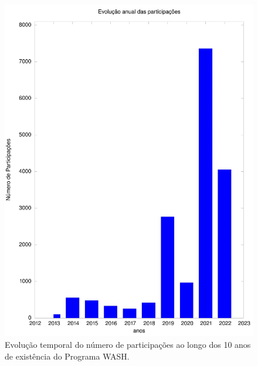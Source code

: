 \documentclass[
12pt,		%
openright,	%
twoside,  %
a4paper,			%
chapter=TITLE,		%
english,			%
french,				%
spanish,			%
brazil				%
]{USPSC-classe/USPSC}
\begin{document}
\captionsetup{format=plain}
\begin{figure}[max size={\textwidth}{\textheight}]

\centering


\begin{minipage}[b]{0.4\linewidth}
        \centering
                \includegraphics[width=1.0\linewidth]{../../imagens/output-participantes.jpeg}
                \caption{Evolu\c{c}\~ao temporal do n\'umero de participa\c{c}\~oes ao longo dos 10 anos de exist\^encia do Programa WASH.}
                \label{19699bcc5ab8317274249d6743d62534dbfb95fa}
\end{minipage}%
\hspace{0.5cm}
\begin{minipage}[b]{0.4\linewidth}
        \centering

\end{minipage}
\end{figure}
\end{document}
